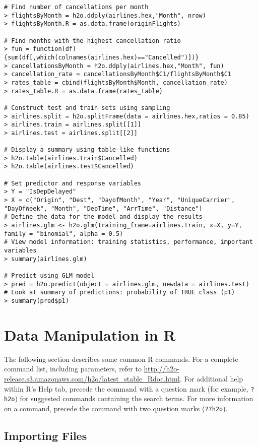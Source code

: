 {\begin{lstlisting}[style=R]
# Find number of cancellations per month
> flightsByMonth = h2o.ddply(airlines.hex,"Month", nrow)
> flightsByMonth.R = as.data.frame(originFlights)

# Find months with the highest cancellation ratio
> fun = function(df) {sum(df[,which(colnames(airlines.hex)=="Cancelled")])}
> cancellationsByMonth = h2o.ddply(airlines.hex,"Month", fun)
> cancellation_rate = cancellationsByMonth$C1/flightsByMonth$C1
> rates_table = cbind(flightsByMonth$Month, cancellation_rate)
> rates_table.R = as.data.frame(rates_table)

# Construct test and train sets using sampling
> airlines.split = h2o.splitFrame(data = airlines.hex,ratios = 0.85)
> airlines.train = airlines.split[[1]]
> airlines.test = airlines.split[[2]]

# Display a summary using table-like functions
> h2o.table(airlines.train$Cancelled)
> h2o.table(airlines.test$Cancelled)

# Set predictor and response variables
> Y = "IsDepDelayed"
> X = c("Origin", "Dest", "DayofMonth", "Year", "UniqueCarrier", "DayOfWeek", "Month", "DepTime", "ArrTime", "Distance")
# Define the data for the model and display the results
> airlines.glm <- h2o.glm(training_frame=airlines.train, x=X, y=Y, family = "binomial", alpha = 0.5)
# View model information: training statistics, performance, important variables
> summary(airlines.glm)

# Predict using GLM model
> pred = h2o.predict(object = airlines.glm, newdata = airlines.test)
# Look at summary of predictions: probability of TRUE class (p1)
> summary(pred$p1)

\end{lstlisting}
\newpage
\section{Data Manipulation in R}

The following section describes some common R commands. For a complete command list, including parameters, refer to {\url{http://h2o-release.s3.amazonaws.com/h2o/latest_stable_Rdoc.html}}.
For additional help within R's Help tab, precede the command with a question mark (for example, {\texttt{?h2o}}) for suggested commands containing the search terms. For more information on a command, precede the command with two question marks ({\texttt{??h2o}}). 

\subsection{Importing Files}

}
